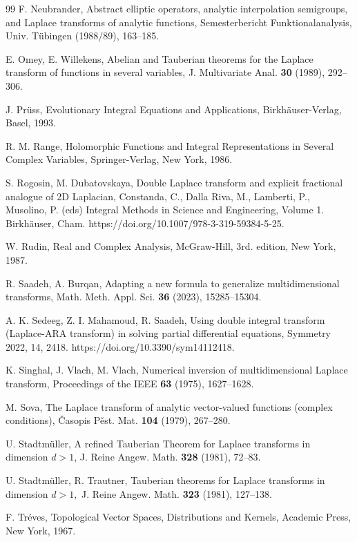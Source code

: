\documentclass{amsart}
\theoremstyle{definition}
\theoremstyle{remark}
\numberwithin{equation}{section}
\begin{document}
\begin{thebibliography}{99}
F. Neubrander, 
Abstract elliptic operators, analytic interpolation semigroups,
and Laplace transforms of analytic functions,
Semesterbericht
Funktionalanalysis, Univ. T\"ubingen (1988/89), 163–185.

E. Omey, E. Willekens,
Abelian and Tauberian theorems for the Laplace transform of functions in several variables,
J. Multivariate Anal.
{\bf 30} (1989), 292--306.

J. Pr\"uss, 
Evolutionary Integral Equations and
Applications,
Birkh\"auser-Verlag, Basel, 1993.

R. M. Range,
Holomorphic Functions and Integral Representations in Several Complex Variables, 
Springer-Verlag, New York, 1986.

S. Rogosin, M. Dubatovskaya,
Double Laplace transform and explicit
fractional analogue of 2D Laplacian,
Constanda, C., Dalla Riva, M., Lamberti, P., Musolino, P. (eds) Integral Methods in Science and Engineering, Volume 1. Birkh\"auser, Cham. https://doi.org/10.1007/978-3-319-59384-5-25.

W. Rudin, 
Real and Complex Analysis, McGraw-Hill, 3rd. edition, New York,
1987.

R. Saadeh, A. Burqan,
Adapting a new formula to generalize multidimensional
transforms,
Math. Meth. Appl. Sci. {\bf 36} (2023), 15285--15304. 

A. K. Sedeeg, Z. I. Mahamoud, R. Saadeh, Using double integral transform (Laplace-ARA transform) in solving partial differential equations, 
Symmetry 2022, 14, 2418. https://doi.org/10.3390/sym14112418.

K. Singhal, J. Vlach, M. Vlach,
Numerical inversion of multidimensional Laplace transform,
Proceedings of the IEEE {\bf 63}
(1975), 1627--1628.

M. Sova, 
The Laplace transform of analytic vector-valued functions
(complex conditions), 
\v Casopis P\v est. Mat. {\bf 104} (1979), 267--280.

U. Stadtm\"uller,
A refined Tauberian Theorem for Laplace transforms in dimension $d>1$,
J. Reine Angew. Math. {\bf 328} (1981), 72--83.

U. Stadtm\"uller,
R. Trautner, 
Tauberian theorems for Laplace transforms
in dimension $d>1,$ 
J. Reine Angew. Math. {\bf 323} (1981), 127--138.

F. Tr\'eves,
Topological Vector Spaces, Distributions and Kernels,
Academic Press, New York, 1967.


\end{thebibliography}
\end{document}
